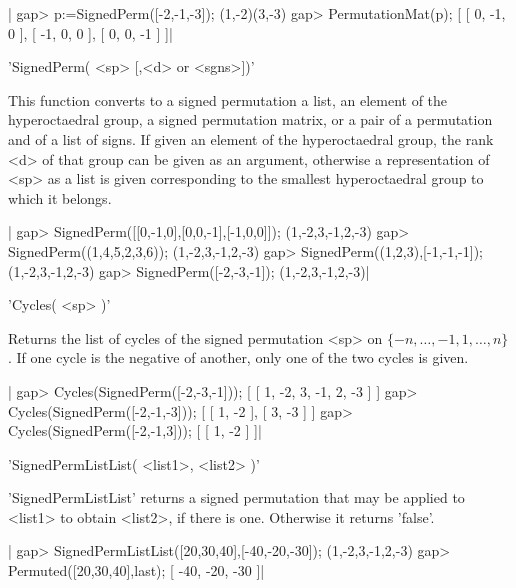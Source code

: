|    gap> p:=SignedPerm([-2,-1,-3]);
    (1,-2)(3,-3)
    gap> PermutationMat(p);
    [ [ 0, -1, 0 ], [ -1, 0, 0 ], [ 0, 0, -1 ] ]|

%
%

'SignedPerm( <sp> [,<d> or <sgns>])'

This  function converts to a  signed permutation a list,  an element of the
hyperoctaedral  group,  a  signed  permutation  matrix,  or  a  pair  of  a
permutation   and  of  a  list  of  signs.  If  given  an  element  of  the
hyperoctaedral  group,  the  rank  <d>  of  that  group  can be given as an
argument,   otherwise  a  representation  of  <sp>   as  a  list  is  given
corresponding to the smallest hyperoctaedral group to which it belongs.

|    gap> SignedPerm([[0,-1,0],[0,0,-1],[-1,0,0]]);
    (1,-2,3,-1,2,-3)
    gap> SignedPerm((1,4,5,2,3,6));
    (1,-2,3,-1,2,-3)
    gap> SignedPerm((1,2,3),[-1,-1,-1]);
    (1,-2,3,-1,2,-3)
    gap> SignedPerm([-2,-3,-1]);
    (1,-2,3,-1,2,-3)|

%
%

'Cycles( <sp> )'

Returns   the  list   of  cycles   of  the   signed  permutation   <sp>  on
$\{-n,\ldots,-1,1,\ldots,n\}$.  If one  cycle is  the negative  of another,
only one of the two cycles is given.

|    gap> Cycles(SignedPerm([-2,-3,-1]));
    [ [ 1, -2, 3, -1, 2, -3 ] ]
    gap> Cycles(SignedPerm([-2,-1,-3]));
    [ [ 1, -2 ], [ 3, -3 ] ]
    gap> Cycles(SignedPerm([-2,-1,3]));
    [ [ 1, -2 ] ]|

%
%

    'SignedPermListList( <list1>, <list2> )'

'SignedPermListList'  returns a signed  permutation that may  be applied to
<list1> to obtain <list2>, if there is one. Otherwise it returns 'false'.

|    gap> SignedPermListList([20,30,40],[-40,-20,-30]);
    (1,-2,3,-1,2,-3)
    gap> Permuted([20,30,40],last);
    [ -40, -20, -30 ]|

%
%

